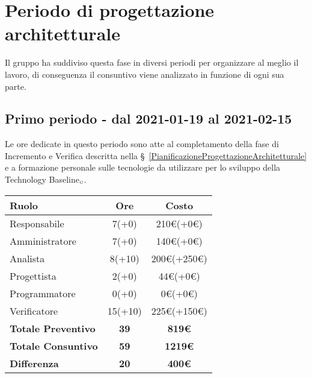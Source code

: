 {{\section{Periodo di progettazione architetturale}\label{ConsuntivoPeriodoDiProgettazioneArchitetturale}

Il gruppo ha suddiviso questa fase in diversi periodi per organizzare al meglio il lavoro, di conseguenza il consuntivo viene analizzato in funzione di ogni sua parte.

\subsection{Primo periodo - dal 2021-01-19 al 2021-02-15}\label{ConsuntivoPeriodoDiProgettazioneArchitetturaleIncrementoEVerifica}

Le ore dedicate in questo periodo sono atte al completamento della fase di Incremento e Verifica descritta nella \S~\ref{PianificazioneProgettazioneArchitetturale} e a formazione personale sulle tecnologie da utilizzare per lo sviluppo della Technology Baseline$_{\scaleto{G}{3pt}}$.

\quad
\def\tabularxcolumn#1{m{#1}}
{
	\begin{center}
		\renewcommand{\arraystretch}{1.4}
		\begin{tabularx}{10cm}{|X|c|c|}
			\hline
			\rowcolor{airforceblue}
			\textbf{Ruolo} & \textbf{Ore} & \textbf{Costo}\\
			\hline
			Responsabile & 7(+0) & 210\euro(+0\euro)\\
			\hline
			Amministratore & 7(+0) & 140\euro(+0\euro)\\
			\hline
			Analista & 8(+10) & 200\euro(+250\euro)\\
			\hline
			Progettista & 2(+0) & 44\euro(+0\euro)\\
			\hline
			Programmatore & 0(+0) & 0\euro(+0\euro)\\
			\hline
			Verificatore & 15(+10) & 225\euro(+150\euro)\\
			\hline
			\textbf{Totale Preventivo} & \textbf{39} & \textbf{819\euro}\\
			\hline
			\textbf{Totale Consuntivo} & \textbf{59} & \textbf{1219\euro}\\
			\hline
			\textbf{Differenza} & \textbf{20} & \textbf{400\euro}
		\end{tabularx}
	\end{center}

}}}
